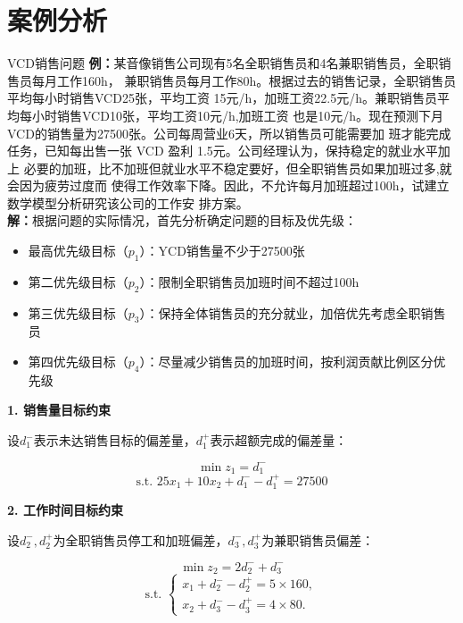     \section{案例分析}
    \begin{exbox}{VCD销售问题}{}
        \textbf{例：}某音像销售公司现有5名全职销售员和4名兼职销售员，全职销售员每月工作160h，
        兼职销售员每月工作80h。根据过去的销售记录，全职销售员平均每小时销售VCD25张，平均工资
        15元/h，加班工资22.5元/h。兼职销售员平均每小时销售VCD10张，平均工资10元/h,加班工资
        也是10元/h。现在预测下月VCD的销售量为27500张。公司每周营业6天，所以销售员可能需要加
        班才能完成任务，已知每出售一张 VCD 盈利 1.5元。公司经理认为，保持稳定的就业水平加上
        必要的加班，比不加班但就业水平不稳定要好，但全职销售员如果加班过多,就会因为疲劳过度而
        使得工作效率下降。因此，不允许每月加班超过100h，试建立数学模型分析研究该公司的工作安
        排方案。\\
        \textbf{解：}根据问题的实际情况，首先分析确定问题的目标及优先级：

        \begin{itemize}
            \item 最高优先级目标（$p_1$）：YCD销售量不少于27500张
            \item 第二优先级目标（$p_2$）：限制全职销售员加班时间不超过100h
            \item 第三优先级目标（$p_3$）：保持全体销售员的充分就业，加倍优先考虑全职销售员
            \item 第四优先级目标（$p_4$）：尽量减少销售员的加班时间，按利润贡献比例区分优先级
        \end{itemize}
        
        \noindent \textbf{1. 销售量目标约束}
        
        设$d_1^-$表示未达销售目标的偏差量，$d_1^+$表示超额完成的偏差量：
        
        \[
        \min z_1 = d_1^-
        \]
        \[
        \text{s.t. } 25x_1 + 10x_2 + d_1^- - d_1^+ = 27500
        \]
        
        \noindent \textbf{2. 工作时间目标约束}
        
        设$d_2^-, d_2^+$为全职销售员停工和加班偏差，$d_3^-, d_3^+$为兼职销售员偏差：
        
        \[
        \min z_2 = 2d_2^- + d_3^-
        \]
        \[
        \text{s.t. }
        \begin{cases}
        x_1 + d_2^- - d_2^+ = 5 \times 160, \\
        x_2 + d_3^- - d_3^+ = 4 \times 80.
        \end{cases}
        \]
        

\end{exbox}
